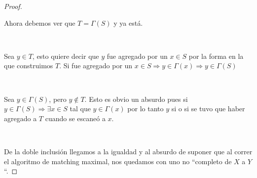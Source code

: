\documentclass[11pt]{article}
\begin{document}
\begin{proof}
\

Ahora debemos ver que $T = \Gamma(S)$ y ya está.\par
\

Sea $y \in T$, esto quiere decir que $y$ fue agregado por un $x \in S$ por la forma en la que construimos $T$. Si fue agregado por un $x \in S \Rightarrow y \in \Gamma(x) \Rightarrow y \in \Gamma(S)$ \par
\

Sea $y \in \Gamma(S)$, pero $y \notin T$. Esto es obvio un absurdo pues si $y \in \Gamma(S) \Rightarrow \exists x \in S$ tal que $y \in \Gamma(x)$ por lo tanto $y$ si o si se tuvo que haber agregado a $T$ cuando se escaneó a $x$.\par
\

De la doble inclusión llegamos a la igualdad y al absurdo de suponer que al correr el algoritmo de matching maximal, nos quedamos con uno no ``completo de $X$ a $Y$``.

\end{proof}
\end{document}
